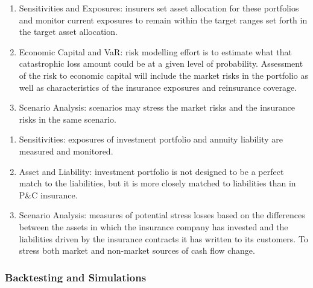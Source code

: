 \begin{remark} 
\begin{enumerate}[label=\roman*.]
\setlength{\itemsep}{0pt}
\item Sensitivities and Exposures: insurers set asset allocation for these portfolios and monitor current exposures to remain within the target ranges set forth in the target asset allocation.
\item Economic Capital and VaR: risk modelling effort is to estimate what that catastrophic loss amount could be at a given level of probability. Assessment of the risk to economic capital will include the market risks in the portfolio as well as characteristics of the insurance exposures and reinsurance coverage.
\item Scenario Analysis: scenarios may stress the market risks and the insurance risks in the same scenario.
\end{enumerate}
\end{remark}

\begin{remark} 
\begin{enumerate}[label=\roman*.]
\setlength{\itemsep}{0pt}
\item Sensitivities: exposures of investment portfolio and annuity liability are measured and monitored.
\item Asset and Liability: investment portfolio is not designed to be a perfect match to the liabilities, but it is more closely matched to liabilities than in P\&C insurance.
\item Scenario Analysis: measures of potential stress losses based on the differences between the assets in which the insurance company has invested and the liabilities driven by the insurance contracts it has written to its customers. To stress both market and non-market sources of cash flow change.
\end{enumerate}
\end{remark}

\subsubsection{Backtesting and Simulations}

